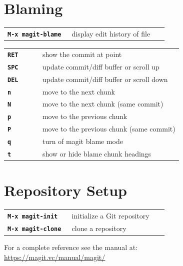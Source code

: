 \documentclass[9pt]{extarticle} %
\begin{document}
\begin{multicols}{3}

  \section*{Blaming}

  \begin{tabular}{L{0.40\linewidth} L{0.60\linewidth}}
    \tt \textbf{M-x magit-blame} & display edit history of file
  \end{tabular}
  \begin{tabular}{L{0.20\linewidth} L{0.80\linewidth}}
    \tt \textbf{RET} & show the commit at point \\
    \tt \textbf{SPC} & update commit/diff buffer or scroll up \\
    \tt \textbf{DEL} & update commit/diff buffer or scroll down \\
    \tt \textbf{n} & move to the next chunk \\
    \tt \textbf{N} & move to the next chunk (same commit) \\
    \tt \textbf{p} & move to the previous chunk \\
    \tt \textbf{P} & move to the previous chunk (same commit) \\
    \tt \textbf{q} & turn of magit blame mode \\
    \tt \textbf{t} & show or hide blame chunk headings
  \end{tabular}


  \section*{Repository Setup}

  \begin{tabular}{L{0.40\linewidth} L{0.60\linewidth}}
    \tt \textbf{M-x magit-init} & initialize a Git repository \\
    \tt \textbf{M-x magit-clone} & clone a repository
  \end{tabular}


  For a complete reference see the manual at: \\
  \url{https://magit.vc/manual/magit/}

\end{multicols}
\end{document}
